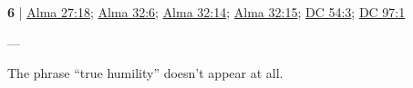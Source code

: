 	\begin{compactdesc}
	
		\item[truly humble] \textbf{6} | \hyperref[ALMA-27-18]{Alma 27:18}; \hyperref[ALMA-32-6]{Alma 32:6}; \hyperref[ALMA-32-14]{Alma 32:14}; \hyperref[ALMA-32-15]{Alma 32:15}; \hyperref[DC54-3]{DC 54:3}; \hyperref[DC97-1]{DC 97:1}
			\begin{compactdesc}
				\item[Bible anchor verses] ---
				\item[Commentary] The phrase ``true humility'' doesn't appear at all.
			\end{compactdesc}
			
			
	\end{compactdesc}
	


	
